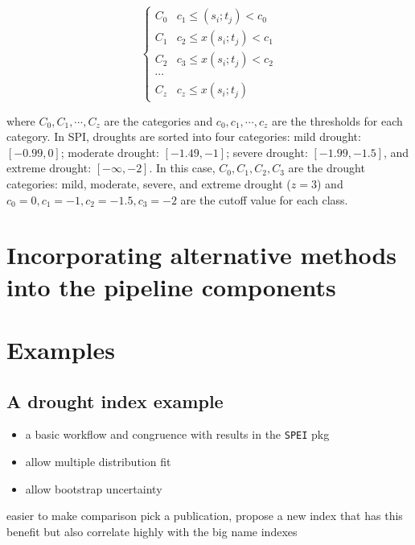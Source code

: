\documentclass[
]{article}
\providecommand{\tightlist}{%
  \setlength{\itemsep}{0pt}\setlength{\parskip}{0pt}}\usepackage{longtable,booktabs,array}
\begin{document}
\begin{equation}
\begin{cases}
C_0 & c_1 \leq (s_i; t_j) < c_0 \\
C_1 & c_2 \leq x(s_i; t_j) < c_1 \\
C_2 & c_3 \leq x(s_i; t_j) < c_2 \\
\cdots \\
C_z & c_z \leq x(s_i; t_j)
\end{cases}
\end{equation}

where \(C_0, C_1,\cdots ,C_z\) are the categories and
\(c_0, c_1, \cdots, c_z\) are the thresholds for each category. In SPI,
droughts are sorted into four categories: mild drought: \([-0.99, 0]\);
moderate drought: \([-1.49, -1]\); severe drought: \([-1.99, -1.5]\),
and extreme drought: \([-\infty, -2]\). In this case,
\(C_0, C_1, C_2, C_3\) are the drought categories: mild, moderate,
severe, and extreme drought (\(z = 3\)) and
\(c_0 =0, c_1 = -1, c_2 = -1.5, c_3 = -2\) are the cutoff value for each
class.

\hypertarget{sec-incorporating-new-buliding-blocks-into-the-pipeline}{%
\section{Incorporating alternative methods into the pipeline
components}\label{sec-incorporating-new-buliding-blocks-into-the-pipeline}}

\hypertarget{sec-examples}{%
\section{Examples}\label{sec-examples}}

\hypertarget{a-drought-index-example}{%
\subsection{A drought index example}\label{a-drought-index-example}}

\begin{itemize}
\tightlist
\item
  a basic workflow and congruence with results in the \texttt{SPEI} pkg
\item
  allow multiple distribution fit
\item
  allow bootstrap uncertainty
\end{itemize}

easier to make comparison pick a publication, propose a new index that
has this benefit but also correlate highly with the big name indexes
\end{document}
